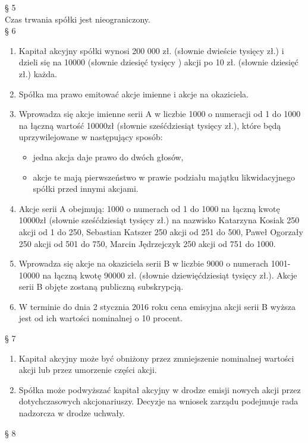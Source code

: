 \documentclass[a4paper, 11pt]{article}
\begin{document}
§ 5 \\

Czas trwania spółki jest nieograniczony.\\ 

§ 6\\

\begin{enumerate}
\item	Kapitał akcyjny spółki wynosi 200 000 zł. (słownie dwieście tysięcy zł.) i dzieli się na 10000 (słownie dziesięć tysięcy ) akcji po  10  zł. (słownie dziesięć zł.) każda.
\item	Spółka ma prawo emitować akcje imienne i akcje na okaziciela.
\item	Wprowadza się akcje imienne serii A w liczbie 1000 o numeracji od 1 do 1000 na łączną wartość 10000zł (słownie sześćdziesiąt tysięcy zł.), które będą uprzywilejowane w następujący sposób:
\begin{itemize}
\item jedna akcja daje prawo do dwóch głosów,
\item akcje te mają pierwszeństwo w prawie podziału majątku likwidacyjnego spółki przed innymi akcjami.
\end{itemize}

\item	Akcje serii A obejmują: 1000 o numerach od 1 do 1000 na łączną kwotę 10000zł (słownie sześćdziesiąt tysięcy zł.) na nazwisko Katarzyna Kosiak 250 akcji od 1 do 250, Sebastian Katszer 250 akcji od 251 do 500, Paweł Ogorzały 250 akcji od 501 do 750, Marcin Jędrzejczyk 250 akcji od 751 do 1000.
\item	Wprowadza się akcje na okaziciela serii B w liczbie 9000 o numerach  1001-10000 na łączną kwotę 90000 zł. (słownie dziewięćdziesiąt tysięcy zł.). Akcje serii B objęte zostaną publiczną subskrypcją.
\item W terminie do dnia 2 stycznia 2016 roku cena emisyjna akcji serii B wyższa jest od ich wartości nominalnej o 10 procent.

\end{enumerate}

§ 7\\

\begin{enumerate}
\item	Kapitał akcyjny może być obniżony przez zmniejszenie nominalnej wartości akcji lub przez umorzenie części akcji.
\item	Spółka może podwyższać kapitał akcyjny w drodze emisji nowych akcji przez dotychczasowych akcjonariuszy. Decyzje na wniosek zarządu podejmuje rada nadzorcza w drodze uchwały.
\end{enumerate}
§ 8 \\
\end{document}
